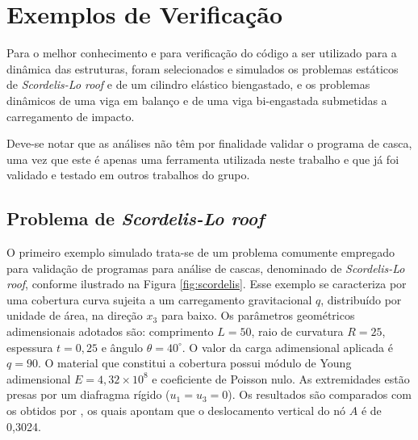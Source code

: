 \section{Exemplos de Verificação} \label{MEFP-Ex}

Para o melhor conhecimento e para verificação do código a ser utilizado para a dinâmica das estruturas, foram selecionados e simulados os problemas estáticos de \textit{Scordelis-Lo roof} e de um cilindro elástico biengastado, e os problemas dinâmicos de uma viga em balanço e de uma viga bi-engastada submetidas a carregamento de impacto.

Deve-se notar que as análises não têm por finalidade validar o programa de casca, uma vez que este é apenas uma ferramenta utilizada neste trabalho e que já foi validado e testado em outros trabalhos do grupo.
\subsection{Problema de \textit{Scordelis-Lo roof}} \label{Ap:SLR}

O primeiro exemplo simulado trata-se de um problema comumente empregado para validação de programas para análise de cascas, denominado de \textit{Scordelis-Lo roof}, conforme ilustrado na Figura \ref{fig:scordelis}. Esse exemplo se caracteriza por uma cobertura curva sujeita a um carregamento gravitacional $q$, distribuído por unidade de área, na direção $x_3$ para baixo. Os parâmetros geométricos adimensionais adotados são: comprimento $L=50$, raio de curvatura $R=25$, espessura $t=0,25$ e ângulo $\theta=40^\circ$. O valor da carga adimensional aplicada é $q=90$. O material que constitui a cobertura possui módulo de Young adimensional $E=4,32\times10^8$ e coeficiente de Poisson nulo. As extremidades estão presas por um diafragma rígido ($u_1=u_3=0$). Os resultados são comparados com os obtidos por , os quais apontam que o deslocamento vertical do nó $A$ é de 0,3024.

